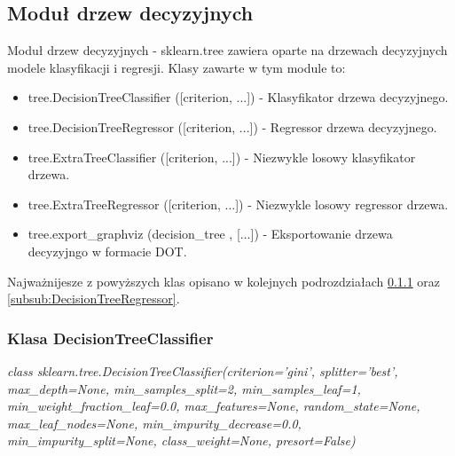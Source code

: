 \documentclass[10pt,a4paper]{article}
\begin{document}
\subsection{Moduł drzew decyzyjnych}
Moduł drzew decyzyjnych - sklearn.tree zawiera oparte na drzewach decyzyjnych modele klasyfikacji i regresji. Klasy zawarte w tym module to:
\begin{itemize}
	\item tree.DecisionTreeClassifier ([criterion, ...]) - Klasyfikator drzewa decyzyjnego.
	\item tree.DecisionTreeRegressor ([criterion, ...]) - Regressor drzewa decyzyjnego.
	\item tree.ExtraTreeClassifier ([criterion, ...]) - Niezwykle losowy klasyfikator drzewa.
	\item tree.ExtraTreeRegressor ([criterion, ...]) - Niezwykle losowy regressor drzewa.
	\item tree.export\_graphviz (decision\_tree , [...]) - Eksportowanie drzewa decyzyjngo w formacie DOT.
\end{itemize}
Najważnijesze z powyższych klas opisano w kolejnych podrozdziałach \ref{subsub:DecisionTreeClassifier} oraz \ref{subsub:DecisionTreeRegressor}.

\subsubsection{Klasa DecisionTreeClassifier}
\label{subsub:DecisionTreeClassifier}
\begin{flushleft}
	\textit{class sklearn.tree.DecisionTreeClassifier(criterion=’gini’, splitter=’best’, max\_depth=None, min\_samples\_split=2, min\_samples\_leaf=1, min\_weight\_fraction\_leaf=0.0, max\_features=None, random\_state=None, max\_leaf\_nodes=None, min\_impurity\_decrease=0.0, min\_impurity\_split=None, class\_weight=None, presort=False)}
\end{flushleft}\par
\vskip 0.2in
\end{document}
